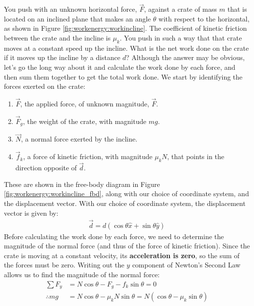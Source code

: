 \begin{example}{\label{ex:workenergy:networkramp}
You push with an unknown horizontal force, $\vec F$, against a crate of mass $m$ that is located on an inclined plane that makes an angle $\theta$ with respect to the horizontal, as shown in Figure \ref{fig:workenergy:workincline}. The coefficient of kinetic friction between the crate and the incline is $\mu_k$. You push in such a way that that crate moves at a constant speed up the incline. What is the net work done on the crate if it moves up the incline by a distance $d$?}
Although the answer may be obvious, let's go the long way about it and calculate the work done by each force, and then sum them together to get the total work done. We start by identifying the forces exerted on the crate:
\begin{enumerate}
\item $\vec F$, the applied force, of unknown magnitude, $\vec F$.
\item $\vec F_g$, the weight of the crate, with magnitude $mg$. 
\item $\vec N$, a normal force exerted by the incline.
\item $\vec f_k$, a force of kinetic friction, with magnitude $\mu_k N$, that points in the direction opposite of $\vec d$. 
\end{enumerate}
These are shown in the free-body diagram in Figure \ref{fig:workenergy:workincline_fbd}, along with our choice of coordinate system, and the displacement vector. 
With our choice of coordinate system, the displacement vector is given by:
\begin{align*}
\vec d = d (\cos\theta \hat x + \sin\theta \hat y)
\end{align*}
Before calculating the work done by each force, we need to determine the magnitude of the normal force (and thus of the force of kinetic friction). Since the crate is moving at a constant velocity, its \textbf{acceleration is zero}, so the sum of the forces must be zero. Writing out the $y$ component of Newton's Second Law allows us to find the magnitude of the normal force:
\begin{align*}
\sum F_y &= N\cos\theta -F_g - f_k\sin\theta = 0\\
\therefore mg &= N\cos\theta-\mu_kN\sin\theta = N(\cos\theta-\mu_k\sin\theta)\\

\end{align*}
\end{example}
